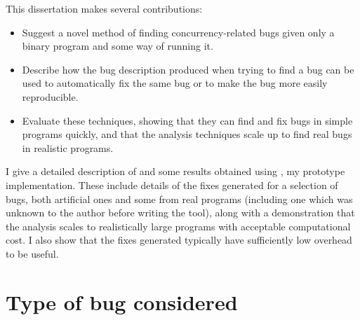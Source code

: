 This dissertation makes several contributions:
\begin{itemize}
\item
  Suggest a novel method of finding concurrency-related bugs given
  only a binary program and some way of running it.
\item
  Describe how the bug description produced when trying to find a bug
  can be used to automatically fix the same bug or to make the bug
  more easily reproducible.
\item
  Evaluate these techniques, showing that they can find and fix bugs
  in simple programs quickly, and that the analysis techniques scale
  up to find real bugs in realistic programs.
\end{itemize}
I give a detailed description of {\technique} and some results
obtained using \implementation, my prototype implementation.  These
include details of the fixes generated for a selection of bugs, both
artificial ones and some from real programs (including one which was
unknown to the author before writing the tool), along with a
demonstration that the analysis scales to realistically large programs
with acceptable computational cost.  I also show that the fixes
generated typically have sufficiently low overhead to be useful.

\section{Type of bug considered}
\label{sect:types_of_bugs}

